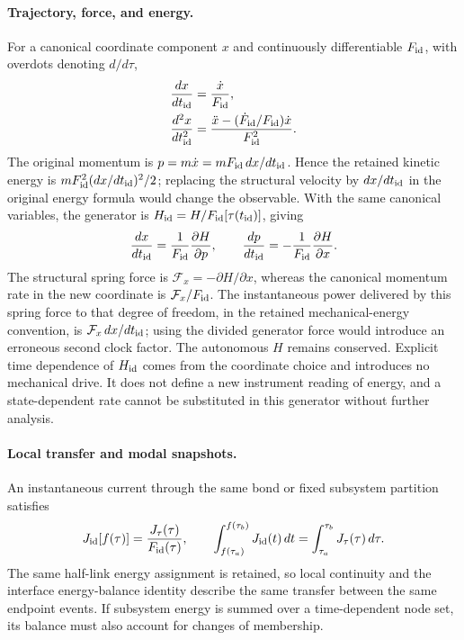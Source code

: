 \documentclass[10pt,aps,onecolumn,notitlepage,nofootinbib]{revtex4-2}
\begin{document}
\paragraph*{Trajectory, force, and energy.}
For a canonical coordinate component $x$ and continuously differentiable $F_{\rm id}$, with overdots denoting $d/d\tau$,
\begin{align*}
 \frac{dx}{dt_{\rm id}}&=\frac{\dot x}{F_{\rm id}},\\
 \frac{d^2x}{dt_{\rm id}^2}
 &=\frac{\ddot x-(\dot F_{\rm id}/F_{\rm id})\dot x}{F_{\rm id}^2}.
\end{align*}
The original momentum is $p=m\dot x=mF_{\rm id}\,dx/dt_{\rm id}$. Hence the retained kinetic energy is $mF_{\rm id}^2(dx/dt_{\rm id})^2/2$; replacing the structural velocity by $dx/dt_{\rm id}$ in the original energy formula would change the observable. With the same canonical variables, the generator is $H_{\rm id}=H/F_{\rm id}[\tau(t_{\rm id})]$, giving
\[
 \frac{dx}{dt_{\rm id}}=\frac{1}{F_{\rm id}}\frac{\partial H}{\partial p},
 \qquad
 \frac{dp}{dt_{\rm id}}=-\frac{1}{F_{\rm id}}\frac{\partial H}{\partial x}.
\]
The structural spring force is $\mathcal F_x=-\partial H/\partial x$, whereas the canonical momentum rate in the new coordinate is $\mathcal F_x/F_{\rm id}$. The instantaneous power delivered by this spring force to that degree of freedom, in the retained mechanical-energy convention, is $\mathcal F_x\,dx/dt_{\rm id}$; using the divided generator force would introduce an erroneous second clock factor. The autonomous $H$ remains conserved. Explicit time dependence of $H_{\rm id}$ comes from the coordinate choice and introduces no mechanical drive. It does not define a new instrument reading of energy, and a state-dependent rate cannot be substituted in this generator without further analysis.

\paragraph*{Local transfer and modal snapshots.}
An instantaneous current through the same bond or fixed subsystem partition satisfies
\[
 J_{\rm id}[f(\tau)]=\frac{J_\tau(\tau)}{F_{\rm id}(\tau)},\qquad
 \int_{f(\tau_a)}^{f(\tau_b)}J_{\rm id}(t)\,dt
 =\int_{\tau_a}^{\tau_b}J_\tau(\tau)\,d\tau.
\]
The same half-link energy assignment is retained, so local continuity and the interface energy-balance identity describe the same transfer between the same endpoint events. If subsystem energy is summed over a time-dependent node set, its balance must also account for changes of membership.
\end{document}
